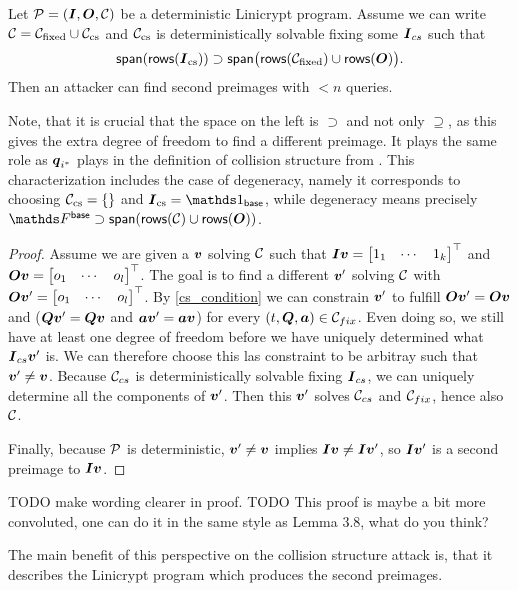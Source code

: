 \begin{lemma}
    Let $\P = (\I, \O, \C)$ be a deterministic Linicrypt program.
    Assume we can write $\C = \Cfix \cup \Ccs$ and
    $\Ccs$ is deterministically solvable fixing some $\I_{cs}$ such that
    \begin{equation}
    \label{cs_condition}
        \spn(\rows(\I_\textrm{cs})) \supset \spn\big(\rows(\C_\textrm{fixed}) \cup \rows(\O)\big).
    \end{equation}
    Then an attacker can find second preimages with $< n$ queries.
\end{lemma}

Note, that it is crucial that the space on the left is $\supset$ and not only $\supseteq$,
as this gives the extra degree of freedom to find a different preimage.
It plays the same role as $\vq_{i^*}$ plays in the definition of collision structure from \cite{TCC:McQSwoRos19}.
This characterization includes the case of degeneracy,
namely it corresponds to choosing $\Ccs = \{\}$ and $\I_\textrm{cs} = \Id_\base$,
while degeneracy means precisely $\Base \supset \spn(\rows(\C) \cup \rows(\O))$.

\begin{proof}
Assume we are given a $\vv$ solving $\C$ such that $\I \vv = \mtdts 1 k$ and $\O \vv = \mtdts o l$.
The goal is to find a different $\vv'$ solving $\C$ with $\O \vv' = \mtdts o l$.
By \eqref{cs_condition} we can constrain $\vv'$ to fulfill $\O \vv' = \O \vv$ and ($\Q \vv' = \Q \vv$ and $\va\vv' = \va\vv$) for every $(t, \Q, \va) \in \C_{fix}$.
Even doing so, we still have at least one degree of freedom before we have uniquely determined what
$\I_{cs} \vv'$ is.
We can therefore choose this las constraint to be arbitray such that $\vv' \neq \vv$.
Because $\C_{cs}$ is deterministically solvable fixing $\I_{cs}$,
we can uniquely determine all the components of $\vv'$.
Then this $\vv'$ solves $\C_{cs}$ and $\C_{fix}$, hence also $\C$.

Finally, because $\P$ is deterministic, $\vv' \neq \vv$ implies $\I \vv \neq \I \vv'$,
so $\I\vv'$ is a second preimage to $\I\vv$.
\end{proof}

TODO
make wording clearer in proof.
TODO
This proof is maybe a bit more convoluted, one can do it in the same style as Lemma 3.8, what do you think?

The main benefit of this perspective on the collision structure attack is,
that it describes the Linicrypt program which produces the second preimages.

